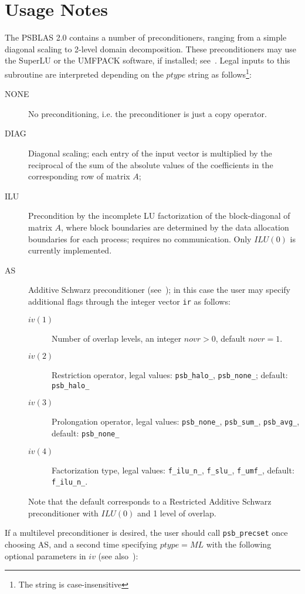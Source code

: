 \section*{Usage Notes}
The PSBLAS 2.0 contains a number of preconditioners, ranging from a
simple diagonal scaling to 2-level domain decomposition. These
preconditioners may use the SuperLU or the UMFPACK software, if
installed; see~\cite{SUPERLU,UMFPACK}. 
Legal inputs to this subroutine are interpreted depending on the
$ptype$ string as follows\footnote{The string is case-insensitive}:
\begin{description}
\item[NONE] No preconditioning, i.e. the preconditioner is just a copy
  operator.
\item[DIAG] Diagonal scaling; each entry of the input vector is
  multiplied by the reciprocal of the sum of the absolute values of
  the coefficients in the corresponding row of matrix  $A$;
\item[ILU] Precondition by the incomplete LU factorization of the
  block-diagonal of matrix $A$, where block boundaries are determined
  by the data allocation boundaries for each process; requires no
  communication. Only $ILU(0)$ is currently implemented. 
\item[AS] Additive Schwarz preconditioner (see~\cite{PARA04}); in this
  case the user may specify additional flags through the integer
  vector \verb|ir| as follows:
\begin{description}
\item[$iv(1)$] Number of overlap levels, an integer $novr>0$, default
  $novr=1$.  
\item[$iv(2)$] Restriction operator, legal values: \verb|psb_halo_|,
  \verb|psb_none_|; default: \verb|psb_halo_|
\item[$iv(3)$] Prolongation operator, legal values: \verb|psb_none_|,
  \verb|psb_sum_|, \verb|psb_avg_|, default: \verb|psb_none_|
\item[$iv(4)$] Factorization type, legal values: \verb|f_ilu_n_|,
  \verb|f_slu_|, \verb|f_umf_|, default: \verb|f_ilu_n_|.
\end{description}
Note that the default corresponds to a Restricted Additive Schwarz
preconditioner with $ILU(0)$ and 1 level of overlap.
\end{description}
If a multilevel preconditioner is desired, the user should call
\verb|psb_precset| once choosing AS, and a second time specifying
$ptype=ML$ with the following optional parameters in $iv$ (see
also~\cite{APNUM,DD2}): 
